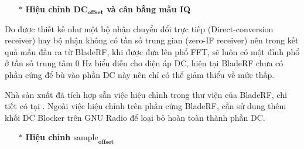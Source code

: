 \begin{itemize}
	\item[$\ast$] \textbf{Hiệu chỉnh $\textbf{DC}_{\textbf{offset}}$ và cân bằng  mẫu IQ}
\end{itemize}

 Do được thiết kế như một bộ nhận chuyển đổi trực tiếp (Direct-conversion receiver) hay bộ nhận không có tần số trung gian (zero-IF receiver) nên trong kết quả mẫu đầu ra từ BladeRF, khi được đưa lên phổ FFT, sẽ luôn có một đỉnh phổ ở tần số trung tâm 0 Hz biểu diễn cho điện áp DC, hiện tại BladeRF chưa có phần cứng để bù vào phần DC này nên chỉ có thể giảm thiểu về mức thấp.

Nhà sản xuất đã tích hợp sẵn việc hiệu chỉnh trong thư viện của BladeRF, chi tiết có tại \cite{Dccali}. Ngoài việc hiệu chỉnh trên phần cứng BladeRF, cần sử dụng thêm khối DC Blocker trên GNU Radio để loại bỏ hoàn toàn thành phần DC.

\begin{itemize}
	\item[$\ast$] \textbf{Hiệu chỉnh $\textrm{sample}_{\textbf{offset}}$}
\end{itemize} 


